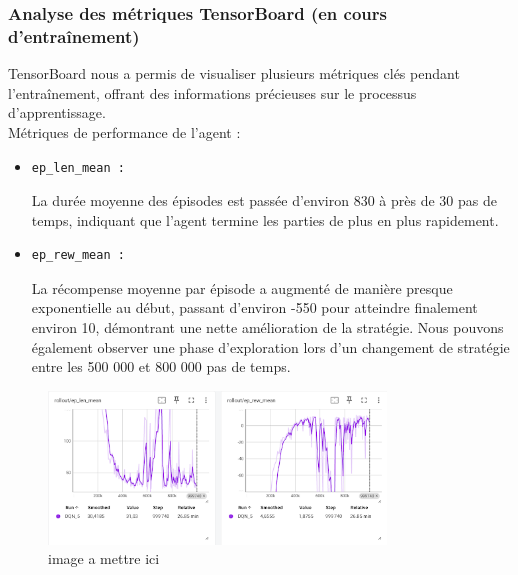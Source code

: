 \documentclass{article}
\begin{document}
    \subsubsection{Analyse des métriques TensorBoard (en cours d'entraînement)}

    \quad TensorBoard nous a permis de visualiser plusieurs métriques clés pendant l'entraînement, offrant des informations précieuses sur le processus d'apprentissage.\\

    Métriques de performance de l'agent :
    \begin{itemize} 
        \item \begin{verbatim}ep_len_mean :\end{verbatim}La durée moyenne des épisodes est passée d'environ 830 à près de 30 pas de temps, indiquant que l'agent termine les parties de plus en plus rapidement.
        \item \begin{verbatim}ep_rew_mean :\end{verbatim}La récompense moyenne par épisode a augmenté de manière presque exponentielle au début, passant d'environ -550 pour atteindre finalement environ 10, démontrant une nette amélioration de la stratégie. Nous pouvons également observer une phase d'exploration lors d'un changement de stratégie entre les 500 000 et 800 000 pas de temps.
    \end{itemize}

    \begin{figure}[ht]
        \centering
        \includegraphics[width=0.8\textwidth]{10.png}
        \caption{image a mettre ici}
    \end{figure}
    
\end{document}
